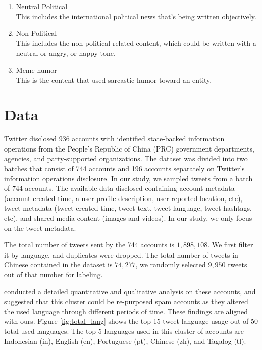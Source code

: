 \documentclass[sigconf]{acmart}
\begin{document}
\begin{enumerate}
  \item Neutral Political \\
  This includes the international political news that's being written objectively. 
  
  \item Non-Political\\
    This includes the non-political related content, which could be written with a neutral or angry, or happy tone. 

  \item Meme humor\\
  This is the content that used sarcastic humor toward an entity.
\end{enumerate}

\section{Data}

Twitter disclosed 936 accounts with identified state-backed information operations from the People’s Republic of China (PRC) government departments, agencies, and party-supported organizations. The dataset was divided into two batches that consist of 744 accounts and 196 accounts separately on Twitter's information operations disclosure. In our study, we sampled tweets from a batch of 744 accounts. The available data disclosed containing account metadata (account created time, a user profile description, user-reported location, etc), tweet metadata (tweet created time, tweet text, tweet language, tweet hashtags, etc), and shared media content (images and videos). In our study, we only focus on the tweet metadata.  

The total number of tweets sent by the 744 accounts is $ 1,898,108$. We first filter it by language, and duplicates were dropped. The total number of tweets in Chinese contained in the dataset is $ 74,277$, we randomly selected $ 9,950$ tweets out of that number for labeling. 

\citet{uren2019tweeting} conducted a detailed quantitative and qualitative analysis on these accounts, and suggested that this cluster could be re-purposed spam accounts as they altered the used language through different periods of time. These findings are aligned with ours. Figure \ref{fig:total_lang} shows the top 15 tweet language usage out of 50 total used languages. The top 5 languages used in this cluster of accounts are  Indonesian (in), English (en), Portuguese (pt), Chinese (zh), and Tagalog (tl). 
\end{document}
